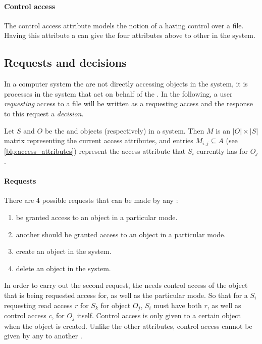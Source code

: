 \paragraph{Control access}
The control access attribute models the notion of a \ssubject{} having control over a file.
Having this attribute a \ssubject{} can give the four attributes above to other \subjects{} in the system.

\subsection{Requests and decisions}
In a computer system the \subjects{} are not directly accessing objects in the system, it is processes in the system that act on behalf of the \ssubject{}.
In the following, a user \emph{requesting} access to a file will be written as a \ssubject{} requesting access and the response to this request a \emph{decision}.

\begin{definition}\label{blp:def:accessmatrix}
  Let $S$ and $O$ be the \subjects{} and objects (respectively) in a system.
  Then $M$ is an $|O| \times |S|$ matrix representing the current access attributes, and entries $M_{i,j} \subseteq A$ (see \cref{blp:access_attributes}) represent the access attribute that $S_i$ currently has for $O_j$.
\end{definition}

\paragraph{Requests}
There are 4 possible requests that can be made by any \ssubject{}:
\begin{enumerate}
  \item be granted access to an object in a particular mode.
  \item another \ssubject{} should be granted access to an object in a particular mode.
  \item create an object in the system.
  \item delete an object in the system.
\end{enumerate}

In order to carry out the second request, the \ssubject{} needs control access of the object that is being requested access for, as well as the particular mode.
So that for a \ssubject{} $S_i$ requesting read access $r$ for \ssubject{} $S_k$ for object $O_j$, $S_i$ must have both $r$, as well as control access $c$, for $O_j$ itself.
Control access is only given to a certain object when the object is created.
Unlike the other attributes, control access cannot be given by any \ssubject{} to another \ssubject{}.

